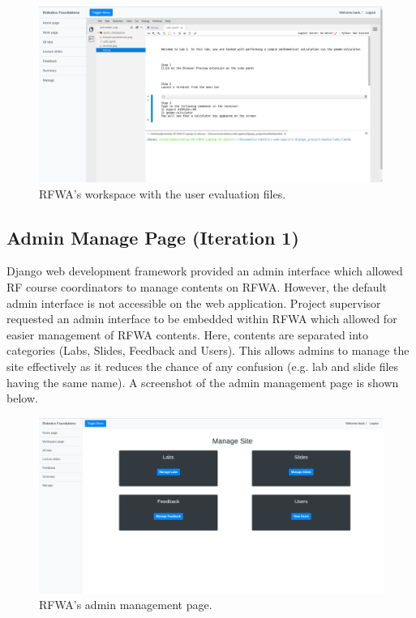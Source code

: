\documentclass{l4proj}
\begin{document}
 \begin{figure}[h]
    \centering
    \includegraphics[scale=0.2]{images/workspace_design.png}
    \caption{RFWA's workspace with the user evaluation files.}
    \label{fig:workspace_page}
\end{figure}

\subsection{Admin Manage Page (Iteration 1)}

Django web development framework provided an admin interface which allowed RF course coordinators to manage contents on RFWA. However, the default admin interface is not accessible on the web application. Project supervisor requested an admin interface to be embedded within RFWA which allowed for easier management of RFWA contents. Here, contents are separated into categories (Labs, Slides, Feedback and Users). This allows admins to manage the site effectively as it reduces the chance of any confusion (e.g. lab and slide files having the same name). A screenshot of the admin management page is shown below.

\begin{figure}[h]
    \includegraphics[scale=0.2]{images/admin_manage.png}
    \caption{RFWA's admin management page.}
    \label{fig:manage_page}
\end{figure}
\end{document}
